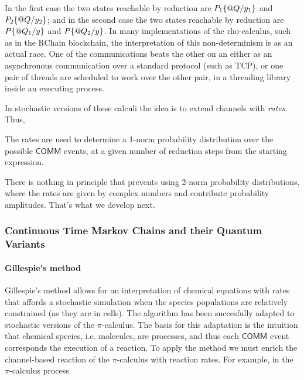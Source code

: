 
In the first case the two states reachable by reduction are
$P_{1}\{ \mathsf{@} Q / y_{1} \}$ and
$P_{2}\{ \mathsf{@} Q / y_{2} \}$; and in the second case the two
states reachable by reduction are $P\{ \mathsf{@} Q_{1} / y \}$ and
$P\{ \mathsf{@} Q_{2} / y \}$. In many implementations of the
rho-calculus, such as in the RChain blockchain, the interpretation of
this non-determinism is as an actual race. One of the communications
beats the other on an either as an asynchronous communication over a
standard protocol (such as TCP), or one pair of threads are scheduled
to work over the other pair, in a threading library inside an
executing process.

In stochastic versions of these calculi the idea is to extend channels
with \emph{rates}. Thus,


The rates are used to determine a 1-norm probability distribution over
the possible $\mathsf{COMM}$ events, at a given number of reduction
steps from the starting expression.

There is nothing in principle that prevents using 2-norm probability
distributions, where the rates are given by complex numbers and
contribute probability amplitudes. That's what we develop next.

\subsubsection{Continuous Time Markov Chains and their Quantum Variants}
\paragraph{Gillespie's method}
Gillespie's method \cite{Gillespie2007} allows for an interpretation
of chemical equations with rates that affords a stochastic simulation
when the species populations are relatively constrained (as they are
in cells). The algorithm has been succesfully adapted to stochastic
versions of the $\pi$-calculus. The basis for this adaptation is the
intuition that chemical species, i.e. molecules, are processes, and
thus each $\mathsf{COMM}$ event corresponds the execution of a
reaction. To apply the method we must enrich the channel-based
reaction of the $\pi$-calculus with reaction rates. For example, in
the $\pi$-calculus process

